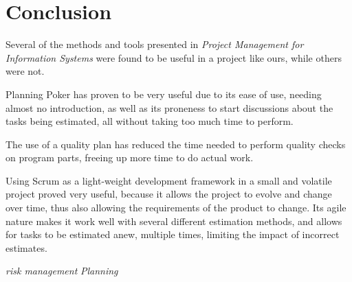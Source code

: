 \section{Conclusion}

Several of the methods and tools presented in \emph{Project Management for
Information Systems}\cite{caye} were found to be useful in a project like ours,
while others were not.

Planning Poker has proven to be very useful due to its ease of use, needing
almost no introduction, as well as its proneness to start discussions about the
tasks being estimated, all without taking too much time to perform.

The use of a quality plan has reduced the time needed to perform quality checks
on program parts, freeing up more time to do actual work.

Using Scrum as a light-weight development framework in a small and volatile
project proved very useful, because it allows the project to evolve and change
over time, thus also allowing the requirements of the product to change. Its
agile nature makes it work well with several different estimation methods, and
allows for tasks to be estimated anew, multiple times, limiting the impact of
incorrect estimates.

\emph{risk management}
\emph{Planning}
